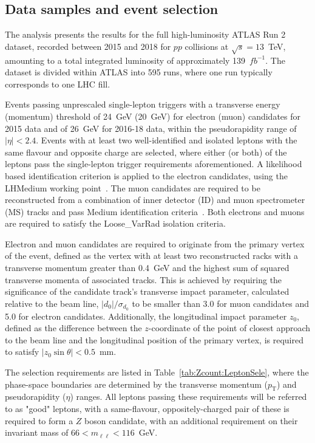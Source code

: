 \subsection{Data samples and event selection}
\label{sec:Zcount:Event selection}

The analysis presents the results for the full high-luminosity ATLAS Run 2 dataset, recorded between 2015 and 2018 for $pp$ collisions at $\sqrt{s}=13$~TeV, amounting to a total integrated luminosity of approximately 139~$fb^{-1}$. The dataset is divided within ATLAS into 595 runs, where one run typically corresponds to one LHC fill.

Events passing unprescaled single-lepton triggers with a transverse energy (momentum) threshold of 24~GeV (20~GeV) for electron (muon) candidates for 2015 data and of 26~GeV for 2016-18 data, within the pseudorapidity range of $|\eta|<2.4$. Events with at least two well-identified and isolated leptons with the same flavour and opposite charge are selected, where either (or both) of the leptons pass the single-lepton trigger requirements aforementioned. A likelihood based identification criterion is applied to the electron candidates, using the LHMedium working point~\cite{ATLAS:2019jvq}. The muon candidates are required to be reconstructed from a combination of inner detector (ID) and muon spectrometer (MS) tracks and pass Medium identification criteria~\cite{ATLAS:2016lqx}. Both electrons and muons are required to satisfy the Loose\_VarRad isolation criteria.

Electron and muon candidates are required to originate from the primary vertex of the event, defined as the vertex with at least two reconstructed racks with a transverse momentum greater than 0.4~GeV and the highest sum of squared transverse momenta of associated tracks. This is achieved by requiring the significance of the candidate track's transverse impact parameter, calculated relative to the beam line, $|d_0|/\sigma_{d_0}$ to be smaller than 3.0 for muon candidates and 5.0 for electron candidates. Additionally, the longitudinal impact parameter $z_0$, defined as the difference between the $z$-coordinate of the point of closest approach to the beam line and the longitudinal position of the primary vertex, is required to satisfy $|z_0\sin\theta|<0.5$~mm.

The selection requirements are listed in Table~\ref{tab:Zcount:LeptonSele}, where the phase-space boundaries are determined by the transverse momentum ($p_\text{T}$) and pseudorapidity ($\eta$) ranges. All leptons passing these requirements will be referred to as "good" leptons, with a same-flavour, oppositely-charged pair of these is required to form a $Z$ boson candidate, with an additional requirement on their invariant mass of $66<m_{\ell\ell}<116$~GeV.


